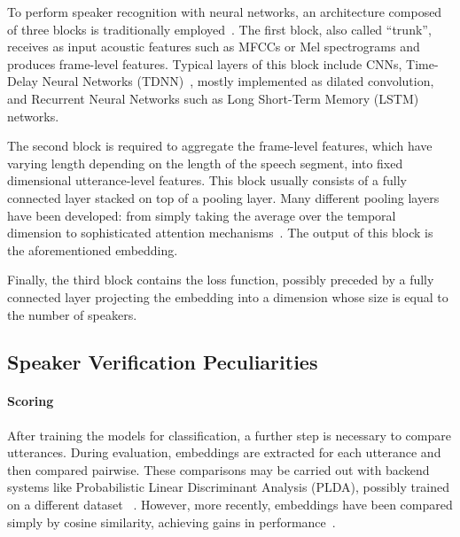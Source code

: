 \documentclass[conference]{IEEEtran}
\begin{document}

To perform speaker recognition with neural networks, an architecture composed of three blocks is traditionally employed~\cite{okabe2018asp}. The first block, also called ``trunk'', receives as input acoustic features such as MFCCs or Mel spectrograms and produces frame-level features. Typical layers of this block include CNNs, Time-Delay Neural Networks (TDNN)~\cite{peddinti2015timedelay}, mostly implemented as dilated convolution, and Recurrent Neural Networks such as Long Short-Term Memory (LSTM) networks. 


The second block is required to aggregate the frame-level features, which have varying length depending on the length of the speech segment, into fixed dimensional utterance-level features. This block usually consists of a fully connected layer stacked on top of a pooling layer. Many different pooling layers have been developed: from simply taking the average over the temporal dimension to sophisticated attention mechanisms~\cite{cai2018exploring}. The output of this block is the aforementioned embedding.

Finally, the third block contains the loss function, possibly preceded by a fully connected layer projecting the embedding into a dimension whose size is equal to the number of speakers. 



\subsection{Speaker Verification Peculiarities}

\paragraph{Scoring}After training the models for classification, a further step is necessary to compare utterances. During evaluation, embeddings are extracted for each utterance and then compared pairwise. These comparisons may be carried out with backend systems like Probabilistic Linear Discriminant Analysis (PLDA), possibly trained on a different dataset ~\cite{snyder2017deep}. However, more recently, embeddings have been compared simply by cosine similarity, achieving gains in performance~\cite{cai2018exploring}.
\end{document}
